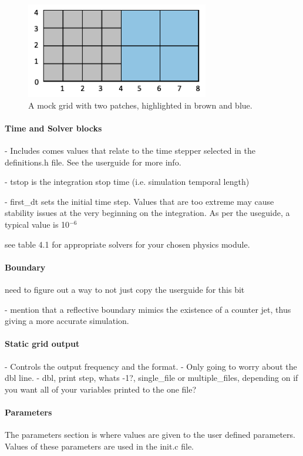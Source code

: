 \documentclass[12pt]{article}
\begin{document}
\begin{figure}[h]
	\includegraphics[width=8cm]{gridspaces}
	\centering
	\caption{A mock grid with two patches, highlighted in brown and blue.}
\end{figure}

\paragraph{Time and Solver blocks}\mbox{}
\newline
- Includes comes values that relate to the time stepper selected in the definitions.h file. See the userguide for more info.

- tstop is the integration stop time (i.e. simulation temporal length)

- first\_dt sets the initial time step. Values that are too extreme may cause stability issues at the very beginning on the integration. As per the useguide, a typical value is 10$^{-6}$

see table 4.1 for appropriate solvers for your chosen physics module.
\paragraph{Boundary}\mbox{}
\newline

need to figure out a way to not just copy the userguide for this bit 

- mention that a reflective boundary mimics the existence of a counter jet, thus giving a more accurate simulation.

\paragraph{Static grid output}\mbox{}
\newline
- Controls the output frequency and the format. 
- Only going to worry about the dbl line.
- dbl, print step, whats -1?, single\_file or multiple\_files, depending on if you want all of your variables printed to the one file?

\paragraph{Parameters}\mbox{}
The parameters section is where values are given to the user defined parameters. Values of these parameters are used in the init.c file.
\newline
\end{document}
